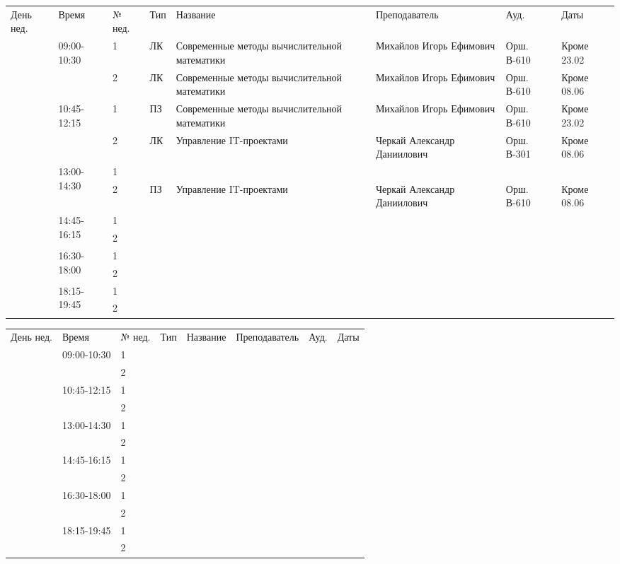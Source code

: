 \begin{tabular}{|p{1cm}|p{2.1cm}|p{0.7cm}|p{1cm}|p{9cm}|p{4cm}|p{2.5cm}|p{2.5cm}|}
\hline
День нед. & Время & № нед. & Тип & Название & Преподаватель & Ауд. & Даты \\
\hhline{|=|=|=|=|=|=|=|=|}
\multirow{12}{*}{Вт} & \multirow{2}{*}{09:00-10:30} & 1 & ЛК  & Современные методы вычислительной математики & Михайлов Игорь Ефимович & Орш. В-610 & Кроме 23.02\\
\cline{3-8} & & 2 & ЛК  & Современные методы вычислительной математики & Михайлов Игорь Ефимович & Орш. В-610 & Кроме 08.06\\
\cline{2-8} & \multirow{2}{*}{10:45-12:15} & 1 & ПЗ  & Современные методы вычислительной математики & Михайлов Игорь Ефимович & Орш. В-610 & Кроме 23.02\\
\cline{3-8} & & 2 & ЛК  & Управление IT-проектами & Черкай Александр Даниилович & Орш. В-301 & Кроме 08.06\\
\cline{2-8} & \multirow{2}{*}{13:00-14:30} & 1 &  &  &  &  & \\
\cline{3-8} & & 2 & ПЗ  & Управление IT-проектами & Черкай Александр Даниилович & Орш. В-610 & Кроме 08.06\\
\cline{2-8} & \multirow{2}{*}{14:45-16:15} & 1 &  &  &  &  & \\
\cline{3-8} & & 2 &  &  &  &  & \\
\cline{2-8} & \multirow{2}{*}{16:30-18:00} & 1 &  &  &  &  & \\
\cline{3-8} & & 2 &  &  &  &  & \\
\cline{2-8} & \multirow{2}{*}{18:15-19:45} & 1 &  &  &  &  & \\
\cline{3-8} & & 2 &  &  &  &  & \\
\hline
\end{tabular}
\newpage

\begin{tabular}{|p{1cm}|p{2.1cm}|p{0.7cm}|p{1cm}|p{9cm}|p{4cm}|p{2.5cm}|p{2.5cm}|}
\hline
День нед. & Время & № нед. & Тип & Название & Преподаватель & Ауд. & Даты \\
\hhline{|=|=|=|=|=|=|=|=|}
\multirow{12}{*}{Ср} & \multirow{2}{*}{09:00-10:30} & 1 &  &  &  &  & \\
\cline{3-8} & & 2 &  &  &  &  & \\
\cline{2-8} & \multirow{2}{*}{10:45-12:15} & 1 &  &  &  &  & \\
\cline{3-8} & & 2 &  &  &  &  & \\
\cline{2-8} & \multirow{2}{*}{13:00-14:30} & 1 &  &  &  &  & \\
\cline{3-8} & & 2 &  &  &  &  & \\
\cline{2-8} & \multirow{2}{*}{14:45-16:15} & 1 &  &  &  &  & \\
\cline{3-8} & & 2 &  &  &  &  & \\
\cline{2-8} & \multirow{2}{*}{16:30-18:00} & 1 &  &  &  &  & \\
\cline{3-8} & & 2 &  &  &  &  & \\
\cline{2-8} & \multirow{2}{*}{18:15-19:45} & 1 &  &  &  &  & \\
\cline{3-8} & & 2 &  &  &  &  & \\
\hline
\end{tabular}
\newpage

